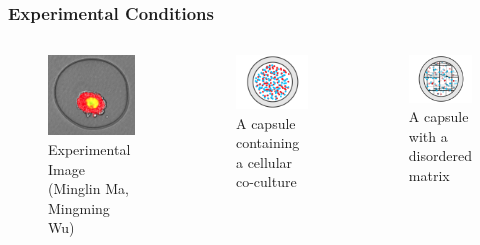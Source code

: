 \documentclass{beamer}
\begin{document}
  
  
  \begin{frame}
    \frametitle{Experimental Conditions}
  	\begin{columns}[t] 
  	\begin{figure}
  	  \includegraphics[width=1.0in]{minglin.png}
  	  \caption{Experimental Image (Minglin Ma, Mingming Wu)}
  	\end{figure}
    \begin{figure}
      \includegraphics[width=1.25in]{Fig1.png}
      \caption{A capsule containing a cellular co-culture}
    \end{figure}
    \begin{figure}
      \includegraphics[width=1.25in]{Fig2.png}
      \caption{A capsule with a disordered matrix}
    \end{figure}
    \end{columns}
    \vfill
    
  \end{frame}
\end{document}
